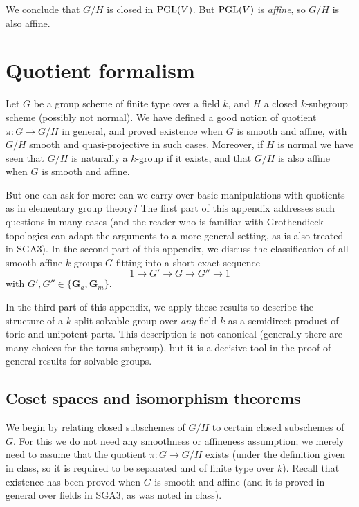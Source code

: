 \documentclass[10pt]{article}
\renewcommand{\(}{\left(}
\renewcommand{\)}{\right)}
\numberwithin{thm}{subsection}
\begin{document}
We conclude that $G/H$ is closed in ${\rm{PGL}}(V)$.  But ${\rm{PGL}}(V)$ is
{\em affine}, so $G/H$ is also affine. 

\section{Quotient formalism}\label{qtformalism}

\medskip\noindent
Let $G$ be a group scheme of finite type over a field $k$, and $H$ a closed $k$-subgroup scheme
(possibly not normal).  We have defined a good notion of quotient $\pi:G \rightarrow G/H$ in general,
and proved existence when $G$ is smooth and affine,
with $G/H$ smooth and quasi-projective in such cases.
Moreover, if $H$ is normal we have seen that $G/H$ is naturally a $k$-group if it exists, and 
that $G/H$ is also affine when $G$ is smooth and affine.   

But one can ask for more:  
can we carry over basic manipulations with quotients as in elementary group theory?
The first part of this appendix addresses such questions in many cases
(and the reader who is familiar with Grothendieck topologies can adapt the arguments
to a more general setting, as is also treated in SGA3).   In the second
part of this appendix, we discuss the classification of all smooth affine $k$-groups $G$ fitting into
a short exact sequence 
$$1 \rightarrow G' \rightarrow G \rightarrow G'' \rightarrow 1$$
with $G', G'' \in \{\mathbf{G}_a, \mathbf{G}_m\}$.

In the third part of this appendix, we apply these results to describe the structure of a $k$-split solvable
group over {\em any} field $k$ as a semidirect product of toric and unipotent parts. This
description is not canonical (generally there are many choices for the torus subgroup),
but it is a decisive tool in the proof of general results for solvable groups. 

\subsection{Coset spaces and isomorphism theorems}\label{sec1}

We begin by relating closed subschemes of $G/H$ to certain closed subschemes of $G$.
For this we do not need any smoothness or affineness assumption; we merely need to assume 
that the quotient $\pi:G \rightarrow 
G/H$ exists (under the definition given in class, so it is required
to be separated and of finite type over $k$).  Recall that existence has been proved
when $G$ is smooth and affine (and it is proved in general over fields in SGA3, as was noted in class).
\end{document}
